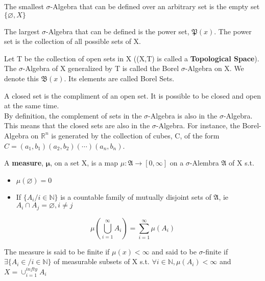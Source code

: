 \begin{ex}
	The smallest $\sigma$-Algebra that can be defined over an arbitrary set is the empty set $\{\varnothing,X\}$
\end{ex}

\begin{ex}
	The largest $\sigma$-Algebra that can be defined is the power set, $\mathfrak{P}(x)$. The power set is the collection of all possible sets of X.
\end{ex}

\begin{ex}
	Let T be the collection of open sets in X ((X,T) is called a \textbf{Topological Space}). The $\sigma$-Algebra of X generalized by T is called the Borel $\sigma$-Algebra on X. We denote this $\mathfrak{B}(x)$. Its elements are called Borel Sets. 
\end{ex}

 A closed set is the compliment of an open set. It is possible to be closed and open at  the same time. \\
 By definition, the complement of sets in the $\sigma$-Algebra is also in the $\sigma$-Algebra. This means that the closed sets are also in the $\sigma$-Algebra. For instance, the Borel-Algebra on $\mathbb{R}^{n}$ is generated by the collection of cubes, C, of the form $C=(a_{1},b_{1})(a_{2},b_{2})(\dotsm)(a_{n},b_{n})$. \\

\begin{leftbar}
\begin{define}
	A \textbf{measure}, $\bm{\mu}$, on a set X, is a map $\mu:\mathfrak{A}\rightarrow[0,\infty]$ on a $\sigma$-Alembra $\mathfrak{A}$ of X s.t.
	\begin{itemize}
		\item $\mu(\varnothing)=0$
		\item If $\{A_{i}/i\in\mathbb{N}\}$ is a countable family of mutually disjoint sets of $\mathfrak{A}$, ie $A_{i}\cap A_{j}=\varnothing, i\neq j$
	\end{itemize}
    \[
    \mu(\bigcup_{i=1}^{\infty}A_{i})=\sum_{i=1}^{\infty}\mu(A_{i})
    \]
\end{define}
\end{leftbar}

The measure is said to be finite if $\mu(x)<\infty$ and said to be $\sigma$-finite if $\exists\{A_{i}\in/i\in\mathbb{N} \}$ of measurable subsets of X s.t. $\forall i\in\mathbb{N},\mu(A_{i})<\infty$ and $X=\cup_{i=1}^{infty}A_{i}$

